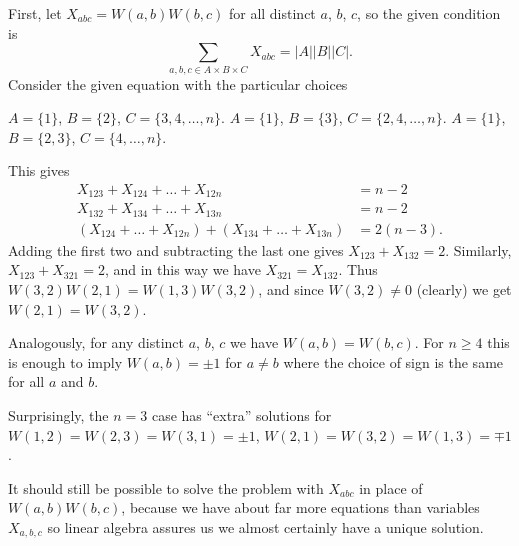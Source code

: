 \documentclass[11pt]{scrartcl}
\begin{document}
First, let $X_{abc} = W(a,b)W(b,c)$ for all distinct $a$, $b$, $c$,
so the given condition is
\[ \sum_{a,b,c \in A \times B \times C} X_{abc} = |A| |B| |C|. \]
Consider the given equation with the particular choices
\begin{itemize}
  \ii $A = \{1\}$, $B = \{2\}$, $C = \{3,4,\dots,n\}$.
  \ii $A = \{1\}$, $B = \{3\}$, $C = \{2,4,\dots,n\}$.
  \ii $A = \{1\}$, $B = \{2,3\}$, $C = \{4,\dots,n\}$.
\end{itemize}
This gives
\begin{align*}
  X_{123} + X_{124} + \dots + X_{12n} &= n-2 \\
  X_{132} + X_{134} + \dots + X_{13n} &= n-2 \\
  (X_{124} + \dots + X_{12n})
  + (X_{134} + \dots + X_{13n}) &= 2(n-3).
\end{align*}
Adding the first two and
subtracting the last one gives $X_{123} + X_{132} = 2$.
Similarly, $X_{123} + X_{321} = 2$,
and in this way we have $X_{321} = X_{132}$.
Thus $W(3,2)W(2,1) = W(1,3)W(3,2)$,
and since $W(3,2) \neq 0$ (clearly) we get $W(2,1) = W(3,2)$.

Analogously, for any distinct $a$, $b$, $c$ we have $W(a,b) = W(b,c)$.
For $n \ge 4$ this is enough to imply $W(a,b) = \pm 1$ for $a \neq b$
where the choice of sign is the same for all $a$ and $b$.

\begin{remark*}
Surprisingly, the $n = 3$ case has ``extra'' solutions for
$W(1,2) = W(2,3) = W(3,1) = \pm1$,
$W(2,1) = W(3,2) = W(1,3) = \mp1$.
\end{remark*}
\begin{remark*}
[Intuition]
It should still be possible to solve the problem
with $X_{abc}$ in place of $W(a,b) W(b,c)$,
because we have about far more equations than variables $X_{a,b,c}$
so linear algebra assures us we almost certainly have a unique solution.
\end{remark*}
\pagebreak
\end{document}
